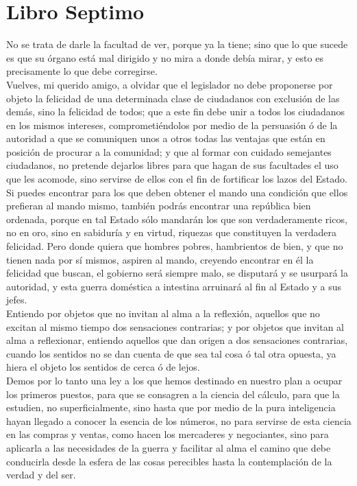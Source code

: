 \documentclass[10pt]{book}
\begin{document}
\chapter*{Libro Septimo}
 No se trata de darle la facultad de ver, porque ya la tiene; sino que lo que sucede es que su órgano está mal dirigido y no mira a donde debía mirar, y esto es precisamente lo que debe corregirse.\\
 Vuelves, mi querido amigo, a olvidar que el legislador no debe proponerse por objeto la felicidad de una determinada clase de ciudadanos con exclusión de las demás, sino la felicidad de todos; que a este fin debe unir a todos los ciudadanos en los mismos intereses, comprometiéndolos por medio de la persuasión ó de la autoridad a que se comuniquen unos a otros todas las ventajas que están en posición de procurar a la comunidad; y que al formar con cuidado semejantes ciudadanos, no pretende dejarlos libres para que hagan de sus facultades el uso que les acomode, sino servirse de ellos con el fin de fortificar los lazos del Estado. \\
Si puedes encontrar para los que deben obtener el mando una condición que ellos prefieran al mando mismo, también podrás encontrar una república bien ordenada, porque en tal Estado sólo mandarán los que son verdaderamente ricos, no en oro, sino en sabiduría y en virtud, riquezas que constituyen la verdadera felicidad. Pero donde quiera que hombres pobres, hambrientos de bien, y que no tienen nada por sí mismos, aspiren al mando, creyendo encontrar en él la felicidad que buscan, el gobierno será siempre malo, se disputará y se usurpará la autoridad, y esta guerra doméstica a intestina arruinará al fin al Estado y a sus jefes. \\
Entiendo por objetos que no invitan al alma a la reflexión, aquellos que no excitan al mismo tiempo dos sensaciones contrarias; y por objetos que invitan al alma a reflexionar, entiendo aquellos que dan origen a dos sensaciones contrarias, cuando los sentidos no se dan cuenta de que sea tal cosa ó tal otra opuesta, ya hiera el objeto los sentidos de cerca ó de lejos.\\
Demos por lo tanto una ley a los que hemos destinado en nuestro plan a ocupar los primeros puestos, para
que se consagren a la ciencia del cálculo, para que la estudien, no superficialmente, sino hasta que por medio de la pura inteligencia hayan llegado a conocer la esencia de los números, no para servirse de esta ciencia en las compras y ventas, como hacen los mercaderes y negociantes, sino para aplicarla a las necesidades de la guerra y facilitar al alma el camino que debe conducirla desde la esfera de las cosas perecibles hasta la contemplación de la verdad y del ser. \\
\end{document}
